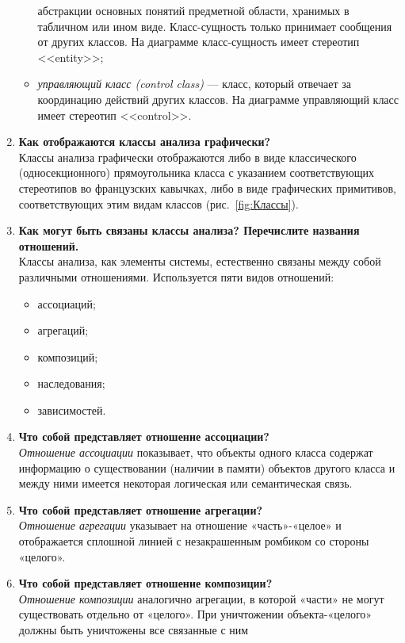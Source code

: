 \begin{enumerate}
\begin{itemize}
		абстракции основных понятий предметной области,
		хранимых в табличном или ином виде.
		Класс-сущность только принимает сообщения от других классов.
		На диаграмме класс-сущность имеет стереотип <<entity>>;
		\item \textit{управляющий класс (control class)} --- класс,
		который отвечает за координацию действий других классов.
		На диаграмме управляющий класс имеет стереотип <<control>>.
	\end{itemize}
	\item \textbf{Как отображаются классы анализа графически?}\\
	Классы анализа графически отображаются либо в виде классического
	(односекционного) прямоугольника класса с указанием соответствующих
	стереотипов во французских кавычках, либо в виде графических
	примитивов, соответствующих этим видам классов
	(рис.~\ref{fig:Классы}).
	\item \textbf{Как могут быть связаны классы анализа?
	Перечислите названия отношений.}\\
	Классы анализа, как элементы системы, естественно связаны между собой
	различными отношениями. Используется пяти видов отношений:
	\begin{itemize}
		\item ассоциаций;
		\item агрегаций;
		\item композиций;
		\item наследования;
		\item зависимостей.
	\end{itemize}
	\item \textbf{Что собой представляет отношение ассоциации?}\\
	\textit{Отношение ассоциации} показывает, что объекты одного класса
	содержат информацию о существовании (наличии в памяти) объектов
	другого класса и между ними имеется некоторая логическая
	или семантическая связь.
	\item \textbf{Что собой представляет отношение агрегации?}\\
	\textit{Отношение агрегации} указывает на отношение «часть»-«целое»
	и отображается сплошной линией с незакрашенным ромбиком
	со стороны «целого».
	\item \textbf{Что собой представляет отношение композиции?}\\
	\textit{Отношение композиции} аналогично агрегации, в которой «части»
	не могут существовать отдельно от «целого». При уничтожении
	объекта-«целого» должны быть уничтожены все связанные с ним

\end{enumerate}
